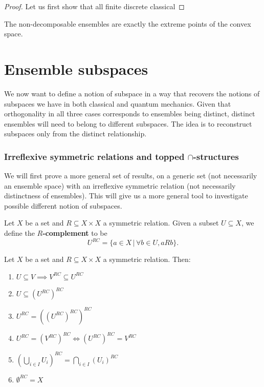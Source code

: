 \begin{proof}
	Let us first show that all finite discrete classical 
\end{proof}

\begin{remark}
	The non-decomposable ensembles are exactly the extreme points of the convex space.
\end{remark}


\section{Ensemble subspaces}

We now want to define a notion of subspace in a way that recovers the notions of subspaces we have in both classical and quantum mechanics. Given that orthogonality in all three cases corresponds to ensembles being distinct, distinct ensembles will need to belong to different subspaces. The idea is to reconstruct subspaces only from the distinct relationship.

\subsubsection{Irreflexive symmetric relations and topped $\cap$-structures}

We will first prove a more general set of results, on a generic set (not necessarily an ensemble space) with an irreflexive symmetric relation (not necessarily distinctness of ensembles). This will give us a more general tool to investigate possible different notion of subspaces.

\begin{defn}
	Let $X$ be a set and $R \subseteq X \times X$ a symmetric relation. Given a subset $U \subseteq X$, we define the \textbf{$R$-complement} to be
	$$ U^{RC} = \{ a \in X \, | \, \forall b \in U, aRb  \}. $$
\end{defn}

\begin{prop}\label{pm_es_rComplProps}
	Let $X$ be a set and $R \subseteq X \times X$ a symmetric relation. Then:
	\begin{enumerate}
		\item $U \subseteq V \implies V^{RC} \subseteq U^{RC}$
		\item $U \subseteq (U^{RC})^{RC}$
		\item $U^{RC} = ((U^{RC})^{RC})^{RC}$
		\item $U^{RC} = (V^{RC})^{RC} \iff (U^{RC})^{RC} = V^{RC}$
		\item $(\bigcup_{i \in I} U_i )^{RC} = \bigcap_{i \in I} (U_i)^{RC}$
		\item $\emptyset^{RC} = X$
	\end{enumerate}
\end{prop}

